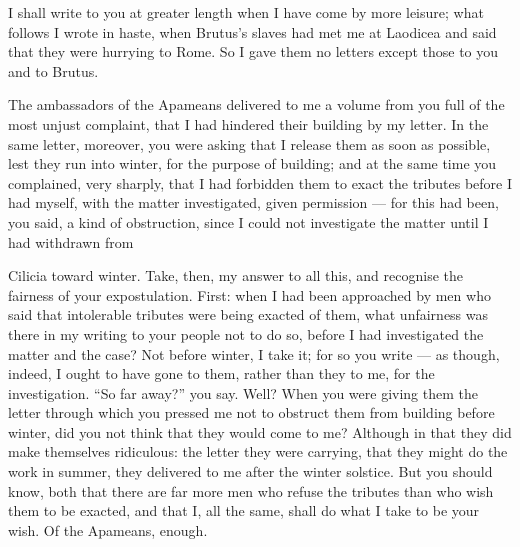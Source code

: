 

 I shall write to you at greater length when I have come by more leisure; what follows I wrote in haste, when Brutus's slaves had met me at Laodicea and said that they were hurrying to Rome. So I gave them no letters except those to you and to Brutus.

 The ambassadors of the Apameans delivered to me a volume from you full of the most unjust complaint, that I had hindered their building by my letter. In the same letter, moreover, you were asking that I release them as soon as possible, lest they run into winter, for the purpose of building; and at the same time you complained, very sharply, that I had forbidden them to exact the tributes before I had myself, with the matter investigated, given permission --- for this had been, you said, a kind of obstruction, since I could not investigate the matter until I had withdrawn from

 Cilicia toward winter. Take, then, my answer to all this, and recognise the fairness of your expostulation. First: when I had been approached by men who said that intolerable tributes were being exacted of them, what unfairness was there in my writing to your people not to do so, before I had investigated the matter and the case? Not before winter, I take it; for so you write --- as though, indeed, I ought to have gone to them, rather than they to me, for the investigation. ``So far away?'' you say. Well? When you were giving them the letter through which you pressed me not to obstruct them from building before winter, did you not think that they would come to me? Although in that they did make themselves ridiculous: the letter they were carrying, that they might do the work in summer, they delivered to me after the winter solstice. But you should know, both that there are far more men who refuse the tributes than who wish them to be exacted, and that I, all the same, shall do what I take to be your wish. Of the Apameans, enough.

